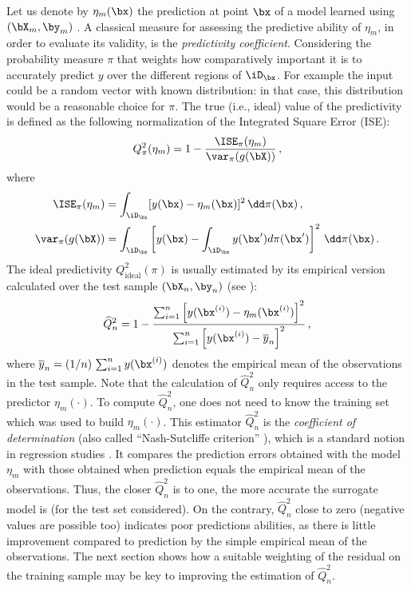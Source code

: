 Let us denote by $\eta_m(\bx)$ the prediction at point $\bx$ of a model learned using $(\bX_m,\by_m)$ \citep{tibshirani_2009,rasmussen_2006}. 
A classical measure for assessing the predictive ability of $\eta_m$, in order to evaluate its validity, is the \textit{predictivity coefficient}. 
Considering the probability measure $\pi$ that weights how comparatively important it is to accurately predict $y$ over the different regions of $\iD_\bx$. 
For example the input could be a random vector with known distribution: in that case, this distribution would be a reasonable choice for $\pi$. 
The true (i.e., ideal) value of the predictivity is defined as the following normalization of the Integrated Square Error (ISE): 
\begin{equation}\label{eq:Q2th}
Q_\pi^2(\eta_m) = 1 - \frac{\ISE_\pi(\eta_m)}{\var_\pi(g(\bX))} \,, 
\end{equation}
where
\begin{align*}
  \ISE_\pi(\eta_m) &= \int_{\iD_\bx} [y(\bx)-\eta_m(\bx)]^2 \, \dd\pi(\bx) \,, \\
  \var_\pi(g(\bX)) &= \int_{\iD_\bx} \left[y(\bx)-\int_{\iD_\bx} y(\bx') d\pi(\bx') \right]^2 \, \dd\pi(\bx)\,.
\end{align*}
The ideal predictivity $Q_{\mathrm{ideal}}^2(\pi)$ is usually estimated by its empirical version calculated over the test sample $(\bX_n,\by_n)$ (see \citealp[p.~32]{daveiga_iooss_2021}): 
\begin{equation}\label{eq:Q2test}
\widehat Q^2_n = 1 - \frac{ \sum_{i=1}^n \left[ y(\bx^{(i)})-\eta_m(\bx^{(i)})\right]^2}{\sum_{i=1}^n \left[y(\bx^{(i)})-\overline{y}_n\right]^2}\,,
\end{equation}
where $\overline{y}_n=(1/n)\,\sum_{i=1}^n y(\bx^{(i)})$ denotes the empirical mean of the observations in the test sample. 
Note that the calculation of $\widehat Q^2_n$ only requires access to the predictor $\eta_m(\cdot)$. 
To compute $\widehat Q^2_n$, one does not need to know the training set which was used to build $\eta_m(\cdot)$. 
This estimator $\widehat Q^2_n$ is the \textit{coefficient of determination} (also called ``Nash-Sutcliffe criterion'' \citealp{NashS70}), which is a standard notion in regression studies \citep{klesar00,ioobou10}. 
It compares the prediction errors obtained with the model $\eta_m$ with those obtained when prediction equals the empirical mean of the observations. 
Thus, the closer $\widehat Q^2_n$ is to one, the more accurate the surrogate model is (for the test set considered). 
On the contrary, $\widehat Q^2_n$ close to zero (negative values are possible too) indicates poor predictions abilities, as there is little improvement compared to prediction by the simple empirical mean of the observations. 
The next section shows how a suitable weighting of the residual on the training sample may be key to improving the estimation of $\widehat Q^2_n$. 


